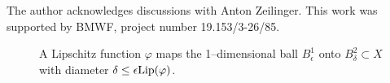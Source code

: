 \documentclass[pra,amssymb,twocolumn]{revtex4}
\begin{document}
The author acknowledges discussions with Anton Zeilinger.
This work was supported by BMWF, project number 19.153/3-26/85.


\begin{figure}
\begin{center}
\end{center}
\caption{A Lipschitz function $\varphi $ maps the
1--dimensional ball $B^1_\epsilon $ onto
$B^2_\delta \subset X$ with diameter $\delta \le
\epsilon {\rm Lip}(\varphi )$.
\label{1996-shatex-f1}}
\end{figure}



\end{document}
